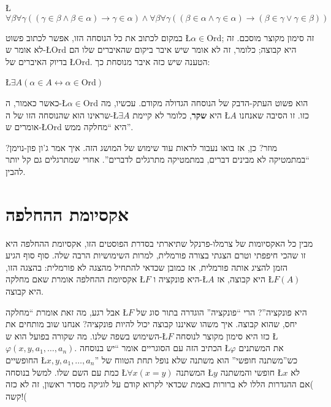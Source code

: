 \documentclass[english,hebrew]{article}
\begin{document}
\L{$\forall\beta\forall\gamma\left(\left(\gamma\in\beta\wedge\beta\in\alpha\right)\to\gamma\in\alpha\right)\wedge\forall\beta\forall\gamma\left(\left(\beta\in\alpha\wedge\gamma\in\alpha\right)\to\left(\beta\in\gamma\vee\gamma\in\beta\right)\right)$}

במקום לכתוב את כל הנוסחה הזו, אפשר לכתוב פשוט \L{$\alpha\in\text{Ord}$};
זה סימון מקוצר מוסכם. זה לא אומר ש-\L{$\text{Ord}$} היא קבוצה; כלומר,
זה לא אומר שיש איבר ביקום שהאיברים שלו הם בדיוק האיברים של \L{$\text{Ord}$}.
הטענה שיש כזה איבר מנוסחת כך:

\L{$\exists A\left(\alpha\in A\leftrightarrow\alpha\in\text{Ord}\right)$}

כאשר כאמור, ה-\L{$\alpha\in\text{Ord}$} הוא פשוט העתק-הדבק של הנוסחה
הגדולה מקודם. עכשיו, מה שראינו הוא שהנוסחה הזו של ה-\L{$\exists A$}
היא \textbf{שקר}, כלומר לא קיימת \L{$A$} כזו. זו הסיבה שאנחנו אומרים
ש-\L{$\text{Ord}$} היא \textquotedblleft מחלקה ממש\textquotedblright .

מוזר? כן, אז בואו נעבור לראות עוד שימוש של המושג הזה. איך אמר ג'ון
פון-נוימן? \textquotedblleft במתמטיקה לא מבינים דברים, במתמטיקה מתרגלים
לדברים\textquotedblright . אחרי שמתרגלים גם קל יותר להבין.

\section*{אקסיומת ההחלפה}

מבין כל האקסיומות של צרמלו-פרנקל שתיארתי בסדרת הפוסטים הזו, אקסיומת
ההחלפה היא זו שהכי חיפפתי וטרם הצגתי בצורה פורמלית, למרות השימושיות
הרבה שלה. סוף סוף הגיע הזמן להציג אותה פורמלית, אז כמובן שכדאי להתחיל
מהצגה לא פורמלית: בהצגה הזו, אקסיומת ההחלפה אומרת שאם מחלקה \L{$F$}
היא פונקציה ו-\L{$A$} היא קבוצה, אז \L{$F\left(A\right)$} היא קבוצה.

אבל רגע, מה זאת אומרת \textquotedblleft מחלקה \L{$F$} היא פונקציה\textquotedblright ?
הרי \textquotedblleft פונקציה\textquotedblright{} הוגדרה בתור סוג של
יחס, שהוא קבוצה. איך משהו שאיננו קבוצה יכול להיות פונקציה? אנחנו שוב
מותחים את השימוש בשפה שלנו. מה שקורה בפועל הוא ש-\L{$F$} כזו היא
סימון מקוצר לנוסחה \L{$\varphi\left(x,y,a_{1},\ldots,a_{n}\right)$}.
הכתיב הזה עם הסוגריים אומר \textquotedblleft יש בנוסחה \L{$\varphi$}
את המשתנים החופשיים \L{$x,y,a_{1},\ldots,a_{n}$}\textquotedblright{}
כש\textquotedblright משתנה חופשי\textquotedblright{} הוא משתנה שלא
נופל תחת הטווח של כמת עם השם שלו. למשל בנוסחה \L{$\forall x\left(x=y\right)$}
המשתנה \L{$y$} חופשי והמשתנה \L{$x$} לא )אם ההגדרות הללו לא ברורות
באמת שכדאי לקרוא קודם על לוגיקה מסדר ראשון, זה לא כזה קשה!(
\end{document}
